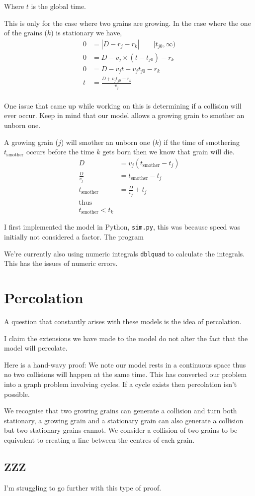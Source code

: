 \documentclass{article}
\begin{document}
Where $t$ is the global time.

This is only for the case where two grains are growing. In the case where the
one of the grains ($k$) is stationary we have,
\begin{align*}
    0 &= |D - r_j - r_k| \qquad [t_{j0}, \infty) \\
    0 &= D - v_j \times (t - t_{j0}) - r_k \\
    0 &= D - v_j t + v_j t_{j0} - r_k \\
    t &= \frac{D + v_j t_{j0} - r_k}{v_j} \\
\end{align*}

One issue that came up while working on this is determining if a collision will
ever occur. Keep in mind that our model allows a growing grain to smother an
unborn one.

A growing grain ($j$) will smother an unborn one ($k$) if the time of
smothering $t_{\text{smother}}$ occurs before the time $k$ gets born
then we know that grain will die.
\begin{align*}
    D &= v_j (t_{\text{smother}} - t_j) \\
    \frac{D}{v_j} &= t_{\text{smother}} - t_j \\
    t_{\text{smother}} &= \frac{D}{v_j} + t_j \\
    \text{thus} \\
    t_{\text{smother}} < t_k
\end{align*}

I first implemented the model in Python, \texttt{sim.py},
this was because speed was initially
not considered a factor. The program 

We're currently also using numeric integrals \texttt{dblquad} to calculate the 
integrals. This has the issues of numeric errors.

\section{Percolation}
A question that constantly arises with these models is the idea of percolation.

I claim the extensions we have made to the model do not alter the fact that the
model will percolate.

Here is a hand-wavy proof: We note our model rests in a continuous space thus
no two collisions will happen at the same time. This has converted our problem
into a graph problem involving cycles. If a cycle exists then percolation isn't
possible.

We recognise that two growing grains
can generate a collision and turn both stationary,
a growing grain and a stationary grain can
also generate a collision but two stationary grains cannot.
We consider a collision of two grains to be equivalent to creating a line
between the centres of each grain.

\subsection{ZZZ}
I'm struggling to go further with this type of proof.
\end{document}
